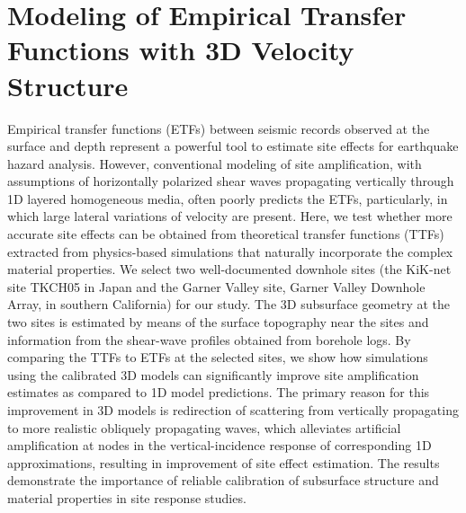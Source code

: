 
\linespread{1.7}
\chapter{Modeling of Empirical Transfer Functions with 3D Velocity Structure}
\linespread{2.0}
\label{chap:etf}

Empirical transfer functions (ETFs) between seismic records observed at the surface and depth represent a
powerful tool to estimate site effects for earthquake hazard analysis. However, conventional modeling of
site amplification, with assumptions of horizontally polarized shear waves propagating vertically through
1D layered homogeneous media, often poorly predicts the ETFs, particularly, in which large lateral variations
of velocity are present. Here, we test whether more accurate site effects can be obtained from theoretical
transfer functions (TTFs) extracted from physics-based simulations that naturally incorporate the complex
material properties. We select two well-documented downhole sites (the KiK-net site TKCH05 in Japan and
the Garner Valley site, Garner Valley Downhole Array, in southern California) for our study. The 3D subsurface
geometry at the two sites is estimated by means of the surface topography near the sites and information
from the shear-wave profiles obtained from borehole logs. By comparing the TTFs to ETFs at the selected sites,
we show how simulations using the calibrated 3D models can significantly improve site amplification estimates
as compared to 1D model predictions. The primary reason for this improvement in 3D models is redirection of
scattering from vertically propagating to more realistic obliquely propagating waves, which alleviates
artificial amplification at nodes in the vertical-incidence response of corresponding 1D approximations,
resulting in improvement of site effect estimation. The results demonstrate the importance of reliable
calibration of subsurface structure and material properties in site response studies.

